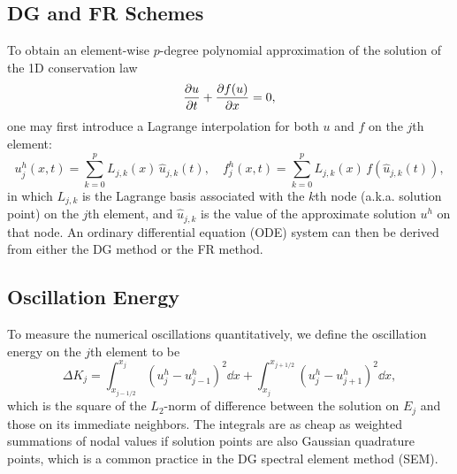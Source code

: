 \documentclass[10pt]{article}
\begin{document}
\subsection{DG and FR Schemes}
To obtain an element-wise $p$-degree polynomial approximation of the solution of the 1D conservation law
$$
\pdv{u}{t}+\pdv{f(u)}{x}=0,
$$
one may first introduce a Lagrange interpolation for both $u$ and $f$ on the $j$th element:
$$
u^h_j(x,t) = \sum_{k=0}^{p} L_{j,k}(x)\,\hat{u}_{j,k}(t),\quad
f^h_j(x,t) = \sum_{k=0}^{p} L_{j,k}(x)\,f(\hat{u}_{j,k}(t)),
$$
in which $L_{j,k}$ is the Lagrange basis associated with the $k$th node (a.k.a. solution point) on the $j$th element, and $\hat{u}_{j,k}$ is the value of the approximate solution $u^h$ on that node.
An ordinary differential equation (ODE) system can then be derived from either the DG method or the FR method.

\subsection{Oscillation Energy}
To measure the numerical oscillations quantitatively, we define the oscillation energy on the $j$th element to be
$$
\Delta K_j = \int_{x_{j-1/2}}^{x_{j}}\left(u_{j}^{h}-u_{j-1}^{h}\right)^{2}\dd{x}+\int_{x_{j}}^{x_{j+1/2}}\left(u_{j}^{h}-u_{j+1}^{h}\right)^{2}\dd{x},
$$
which is the square of the $L_2$-norm of difference between the solution on $E_j$ and those on its immediate neighbors.
The integrals are as cheap as weighted summations of nodal values if solution points are also Gaussian quadrature points, which is a common practice in the DG spectral element method (SEM).
\end{document}
